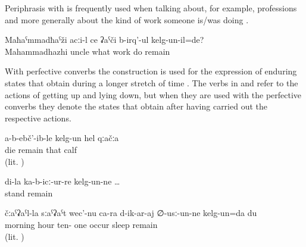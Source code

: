 Periphrasis with  is frequently used when talking about, for example, professions and more generally about the kind of work someone is/was doing .	
	
\begin{exe}
	\ex	\label{ex:‎Which work was uncle Mahammadhazhi doing}
	\gll	Maħaˁmmadħaˁži	acːi-l	ce	ʡaˁči	b-irq'-ul	kelg-un-il=de?	\\
		Mahammadhazhi	uncle	what	work	do	remain\\
	\glt	{}
\end{exe}
%
With perfective converbs the construction is used for the expression of enduring states that obtain during a longer stretch of time . The verbs in  and  refer to the actions of getting up and lying down, but when they are used with the perfective converbs they denote the states that obtain after having carried out the respective actions. 

\begin{exe}
	\ex	\label{ex:The calf stayed alive periphrastic}
	\gll	a-b-ebč'-ib-le	kelg-un	hel	qːačːa\\
		die	remain	that	calf\\
	\glt	{} (lit. )

	\ex	\label{ex:‎‎‎Mine (i.e. my stick) remained upright standing}
	\gll	di-la	ka-b-icː-ur-re	kelg-un-ne	\ldots\\
			stand	remain\\
	\glt	{}

	\ex	\label{ex:In the morning, I slept until eleven}
	\gll	čːaˁʡaˁl-la	sːaˁʡaˁt	wec'-nu	ca-ra	d-ik-ar-aj	∅-usː-un-ne	kelg-un=da	du\\
		morning	hour	ten-	one	occur	sleep		remain	\\
	\glt	{} (lit. )
\end{exe}

